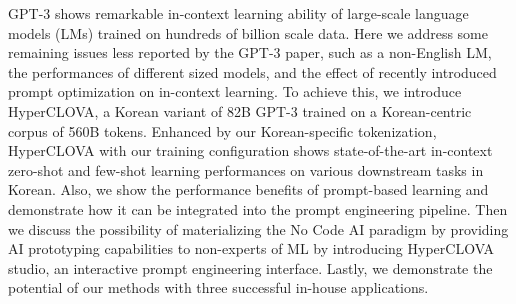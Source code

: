 GPT-3 shows remarkable in-context learning ability of large-scale language models (LMs) trained on hundreds of billion scale data. Here we address some remaining issues less reported by the GPT-3 paper, such as a non-English LM, the performances of different sized models, and the effect of recently introduced prompt optimization on in-context learning. To achieve this, we introduce HyperCLOVA, a Korean variant of 82B GPT-3 trained on a Korean-centric corpus of 560B tokens. Enhanced by our Korean-specific tokenization, HyperCLOVA with our training configuration shows state-of-the-art in-context zero-shot and few-shot learning performances on various downstream tasks in Korean. Also, we show the performance benefits of prompt-based learning and demonstrate how it can be integrated into the prompt engineering pipeline. Then we discuss the possibility of materializing the No Code AI paradigm by providing AI prototyping capabilities to non-experts of ML by introducing HyperCLOVA studio, an interactive prompt engineering interface. Lastly, we demonstrate the potential of our methods with three successful in-house applications.
